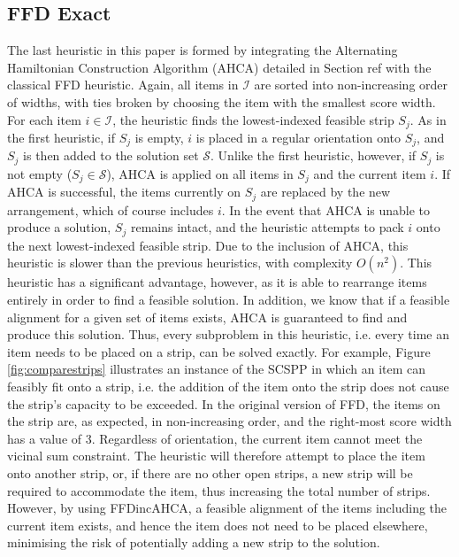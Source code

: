 \documentclass[oribibl]{llncs}
\begin{document}
\subsection{FFD Exact}
\label{sec:ffdexact}
The last heuristic in this paper is formed by integrating the Alternating Hamiltonian Construction Algorithm (AHCA) detailed in Section ref{} with the classical FFD heuristic. Again, all items in $\mathcal{I}$ are sorted into non-increasing order of widths, with ties broken by choosing the item with the smallest score width. For each item $i \in \mathcal{I}$, the heuristic finds the lowest-indexed feasible strip $S_j$. As in the first heuristic, if $S_j$ is empty, $i$ is placed in a regular orientation onto $S_j$, and $S_j$ is then added to the solution set $\mathcal{S}$. Unlike the first heuristic, however, if $S_j$ is not empty ($S_j \in \mathcal{S}$), AHCA is applied on all items in $S_j$ and the current item $i$. If AHCA is successful, the items currently on $S_j$ are replaced by the new arrangement, which of course includes $i$. In the event that AHCA is unable to produce a solution, $S_j$ remains intact, and the heuristic attempts to pack $i$ onto the next lowest-indexed feasible strip. Due to the inclusion of AHCA, this heuristic is slower than the previous heuristics, with complexity $O(n^2)$. This heuristic has a significant advantage, however, as it is able to rearrange items entirely in order to find a feasible solution. In addition, we know that if a feasible alignment for a given set of items exists, AHCA is guaranteed to find and produce this solution. Thus, every subproblem in this heuristic, i.e. every time an item needs to be placed on a strip, can be solved exactly. For example, Figure \ref{fig:comparestrips} illustrates an instance of the SCSPP in which an item can feasibly fit onto a strip, i.e. the addition of the item onto the strip does not cause the strip's capacity to be exceeded. In the original version of FFD, the items on the strip are, as expected, in non-increasing order, and the right-most score width has a value of 3. Regardless of orientation, the current item cannot meet the vicinal sum constraint. The heuristic will therefore attempt to place the item onto another strip, or, if there are no other open strips, a new strip will be required to accommodate the item, thus increasing the total number of strips. However, by using FFDincAHCA, a feasible alignment of the items including the current item exists, and hence the item does not need to be placed elsewhere, minimising the risk of potentially adding a new strip to the solution.
\end{document}

